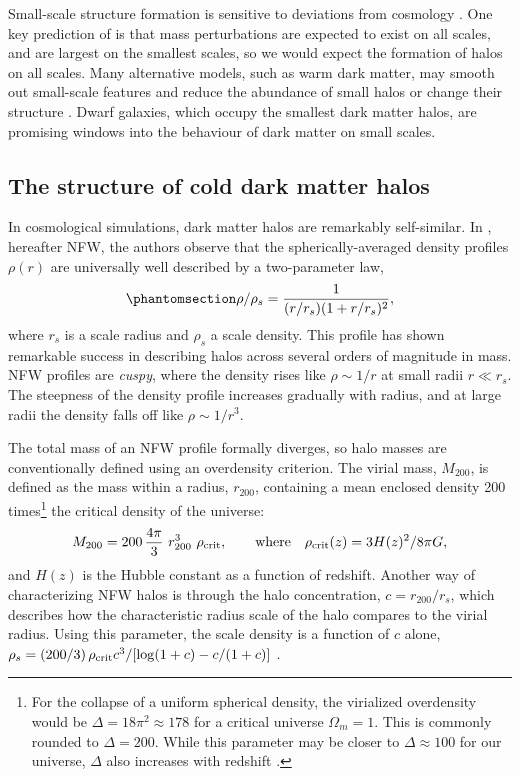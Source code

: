 Small-scale structure formation is sensitive to deviations from \LCDM{}
cosmology \citep[e.g.,][]{bechtol+2022}. One key prediction of \LCDM{}
is that mass perturbations are expected to exist on all scales, and are
largest on the smallest scales, so we would expect the formation of
halos on all scales. Many alternative models, such as warm dark matter,
may smooth out small-scale features and reduce the abundance of small
halos or change their structure \citep[e.g.,][]{lovell+2014}. Dwarf
galaxies, which occupy the smallest dark matter halos, are promising
windows into the behaviour of dark matter on small scales.

\subsection{The structure of cold dark matter
halos}\label{the-structure-of-cold-dark-matter-halos}

In \LCDM{} cosmological simulations, dark matter halos are remarkably
self-similar. In \citet{NFW1996, NFW1997}, hereafter NFW, the authors
observe that the spherically-averaged density profiles \(\rho(r)\) are
universally well described by a two-parameter law,
\begin{equation}\protect\phantomsection\label{eq:nfw}{
\rho/\rho_s= \frac{1}{(r/r_s)(1+r/r_s)^2},
}\end{equation} where \(r_s\) is a scale radius and \(\rho_s\) a scale
density. This profile has shown remarkable success in describing \LCDM{}
halos across several orders of magnitude in mass. NFW profiles are
\emph{cuspy}, where the density rises like \(\rho \sim 1/r\) at small
radii \(r \ll r_s\). The steepness of the density profile increases
gradually with radius, and at large radii the density falls off like
\(\rho \sim 1/r^3\).

The total mass of an NFW profile formally diverges, so halo masses are
conventionally defined using an overdensity criterion. The virial mass,
\(M_{200}\), is defined as the mass within a radius, \(r_{200}\),
containing a mean enclosed density 200 times\footnote{For the collapse
  of a uniform spherical density, the virialized overdensity would be
  \(\Delta = 18\pi^2\approx 178\) for a critical universe
  \(\Omega_m = 1\). This is commonly rounded to \(\Delta = 200\). While
  this parameter may be closer to \(\Delta \approx 100\) for our
  universe, \(\Delta\) also increases with redshift \citep[using eq. 6
  from][]{bryan+norman1998}.} the critical density of the universe:
\begin{equation}{
M_{200} =200\,\frac{4\pi}{3} \ r_{200}^3\ \rho_{\rm crit}, \qquad {\rm where} \quad \rho_{\rm crit}(z) = 3H(z)^2 / 8\pi G,
}\end{equation} and \(H(z)\) is the Hubble constant as a function of
redshift. Another way of characterizing NFW halos is through the halo
concentration, \(c=r_{200} / r_s\), which describes how the
characteristic radius scale of the halo compares to the virial radius.
Using this parameter, the scale density is a function of \(c\) alone,
\(\rho_s = (200/3)\,\rho_{\rm crit} c^3 / [\log(1+c) - c/(1+c)]\)
\citep{NFW1996}.

